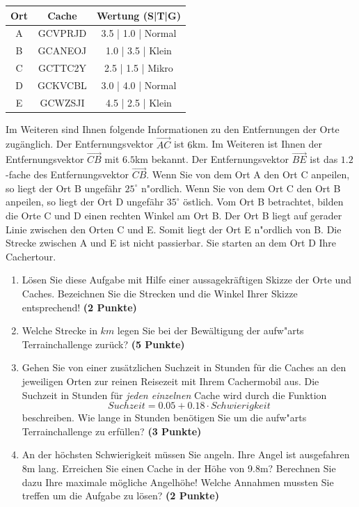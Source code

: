 \documentclass[a4paper, 9pt]{scrartcl}\usepackage[]{graphicx}\usepackage[]{xcolor}
\begin{document}
\begin{center}
  \begin{tabular}{ ccc }
    \toprule
    Ort & Cache & Wertung (S|T|G) \\
    \midrule
    A & GCVPRJD & 3.5 | 1.0 | Normal \\
    B & GCANEOJ & 1.0 | 3.5 | Klein \\ 
    C & GCTTC2Y & 2.5 | 1.5 | Mikro \\ 
    D & GCKVCBL & 3.0 | 4.0 | Normal \\ 
    E & GCWZSJI & 4.5 | 2.5 | Klein \\     
 \bottomrule
\end{tabular}
\end{center}

Im Weiteren sind Ihnen folgende Informationen zu den Entfernungen der Orte
zug{\"a}nglich. Der Entfernungsvektor $\overrightarrow{AC}$ ist
$6$km. Im Weiteren ist Ihnen der Entfernungsvektor
$\overrightarrow{CB}$ mit $6.5$km bekannt. Der
Entfernungsvektor $\overrightarrow{BE}$ ist das $1.2$-fache
des Entfernungsvektor $\overrightarrow{CB}$. Wenn Sie von dem Ort A den Ort
C anpeilen, so liegt der Ort B ungef{\"a}hr $25^\circ$
n{"o}rdlich. Wenn Sie von dem Ort C den Ort B anpeilen, so liegt
der Ort D ungef{\"a}hr $35^\circ$ {\"o}stlich. Vom Ort B
betrachtet, bilden die Orte C und D einen rechten Winkel am Ort B. Der Ort
B liegt auf gerader Linie zwischen den Orten C und E. Somit liegt der Ort E
n{"o}rdlich von B. Die Strecke zwischen A und E ist nicht
passierbar. Sie starten an dem Ort D Ihre Cachertour. \\

\begin{enumerate}
\item L{\"o}sen Sie diese Aufgabe mit Hilfe einer aussagekr{\"a}ftigen Skizze der
  Orte und Caches. Bezeichnen Sie die Strecken und die Winkel Ihrer Skizze
  entsprechend! \textbf{(2 Punkte)}
\item Welche Strecke in $km$ legen Sie bei der Bew{\"a}ltigung der
  aufw{"a}rts Terrainchallenge zur{\"u}ck? \textbf{(5
    Punkte)}
\item Gehen Sie von einer zus{\"a}tzlichen Suchzeit in Stunden f{\"u}r die
  Caches an den jeweiligen Orten zur reinen Reisezeit mit Ihrem Cachermobil
  aus. Die Suchzeit in Stunden f{\"u}r \textit{jeden einzelnen} Cache wird durch die
  Funktion
  \begin{equation*}
    Suchzeit = 0.05 + 0.18 \cdot Schwierigkeit
  \end{equation*}  
  beschreiben.  Wie lange in Stunden ben{\"o}tigen Sie um die
  aufw{"a}rts Terrainchallenge zu erf{\"u}llen? \textbf{(3 Punkte)}
\item An der h{\"o}chsten Schwierigkeit m{\"u}ssen Sie angeln. Ihre Angel ist
  ausgefahren 8m lang. Erreichen Sie einen Cache in der H{\"o}he
  von 9.8m?  Berechnen Sie dazu Ihre maximale m{\"o}gliche
  Angelh{\"o}he! Welche Annahmen mussten Sie treffen um die Aufgabe zu l{\"o}sen? \textbf{(2 Punkte)} 
\end{enumerate}
\end{document}
